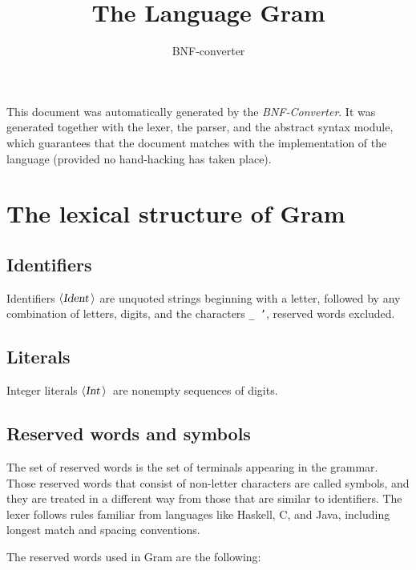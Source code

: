 \documentclass[a4paper,11pt]{article}
\author{BNF-converter}
\title{The Language Gram}
\begin{document}
\maketitle

\newcommand{\emptyP}{\mbox{$\epsilon$}}
\newcommand{\terminal}[1]{\mbox{{\texttt {#1}}}}
\newcommand{\nonterminal}[1]{\mbox{$\langle \mbox{{\sl #1 }} \! \rangle$}}
\newcommand{\arrow}{\mbox{::=}}
\newcommand{\delimit}{\mbox{$|$}}
\newcommand{\reserved}[1]{\mbox{{\texttt {#1}}}}
\newcommand{\literal}[1]{\mbox{{\texttt {#1}}}}
\newcommand{\symb}[1]{\mbox{{\texttt {#1}}}}

This document was automatically generated by the {\em BNF-Converter}. It was generated together with the lexer, the parser, and the abstract syntax module, which guarantees that the document matches with the implementation of the language (provided no hand-hacking has taken place).

\section*{The lexical structure of Gram}
\subsection*{Identifiers}
Identifiers \nonterminal{Ident} are unquoted strings beginning with a letter,
followed by any combination of letters, digits, and the characters {\tt \_ '},
reserved words excluded.


\subsection*{Literals}
Integer literals \nonterminal{Int}\ are nonempty sequences of digits.




\subsection*{Reserved words and symbols}
The set of reserved words is the set of terminals appearing in the grammar. Those reserved words that consist of non-letter characters are called symbols, and they are treated in a different way from those that are similar to identifiers. The lexer follows rules familiar from languages like Haskell, C, and Java, including longest match and spacing conventions.

The reserved words used in Gram are the following: \\
\end{document}
